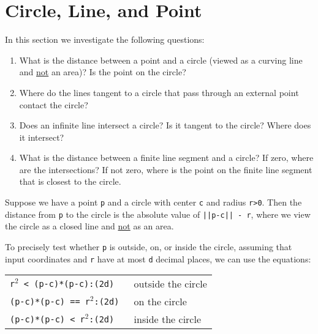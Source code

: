 \documentclass[12pt]{article}
\begin{document}
\newpage


\section{Circle, Line, and Point}
In this section we investigate the following questions:
\begin{enumerate}
\item What is the distance between a point and a circle (viewed as
a curving line and \underline{not} an area)?
Is the point on the circle?
\item Where do the lines tangent to a circle that pass through
an external point contact the
circle?
\item Does an infinite line intersect a circle?  Is it
tangent to the circle?  Where does it intersect?
\item What is the distance between a finite line segment and
a circle?  If zero, where are the intersections?  If not zero,
where is the point on the finite line segment that is closest to the
circle.
\end{enumerate}

Suppose we have a point {\tt p} and a circle with center {\tt c}
and radius {\tt r>0}.  Then the distance from {\tt p} to the circle
is the absolute value of {\tt ||p-c|| - r},
where we view the circle as a closed line
and \underline{not} as an area.

To precisely test whether {\tt p} is outside, on, or inside the
circle, assuming that input coordinates and {\tt r} have at most
{\tt d} decimal places, we can use the equations:
\begin{center}
\begin{tabular}{l@{~~~~~}l}
\tt r$^2$ < (p-c)*(p-c):(2d) & outside the circle \\
\tt (p-c)*(p-c) == r$^2$:(2d) & on the circle \\
\tt (p-c)*(p-c) < r$^2$:(2d) & inside the circle \\
\end{tabular}
\end{center}
\end{document}
